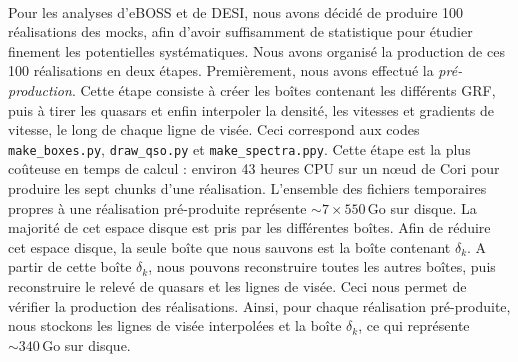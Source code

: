 \paragraph{}
Pour les analyses \lya{} d'eBOSS et de DESI, nous avons décidé de produire \num{100} réalisations des mocks, afin d'avoir suffisamment de statistique pour étudier finement les potentielles systématiques. Nous avons organisé la production de ces 100 réalisations en deux étapes. Premièrement, nous avons effectué la \emph{pré-production}. Cette étape consiste à créer les boîtes contenant les différents GRF, puis à tirer les quasars et enfin interpoler la densité, les vitesses et gradients de vitesse, le long de chaque ligne de visée. Ceci correspond aux codes \texttt{make\_boxes.py}, \texttt{draw\_qso.py} et \texttt{make\_spectra.ppy}. Cette étape est la plus coûteuse en temps de calcul : environ 43 heures CPU sur un n{\oe}ud de Cori pour produire les sept chunks d'une réalisation. L'ensemble des fichiers temporaires propres à une réalisation pré-produite représente $\sim 7 \times \num{550}\,\mathrm{Go}$ sur disque.
La majorité de cet espace disque est pris par les différentes boîtes. Afin de réduire cet espace disque, la seule boîte que nous sauvons est la boîte contenant $\delta_k$.  %
  A partir de cette boîte $\delta_k$, nous pouvons reconstruire toutes les autres boîtes, puis reconstruire le relevé de quasars et les lignes de visée. Ceci nous permet de vérifier la production des réalisations.
  Ainsi, pour chaque réalisation pré-produite, nous stockons les lignes de visée interpolées et la boîte $\delta_k$, ce qui représente $\sim \num{340}\,\mathrm{Go}$ sur disque.

